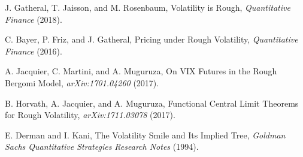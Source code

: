 \documentclass[12pt]{article}
\numberwithin{equation}{section}
\begin{document}
%
%
%
%

\begin{thebibliography}{}

 {J. Gatheral, T. Jaisson, and M. Rosenbaum},
{Volatility is Rough},
{\textit{Quantitative Finance}} (2018).

 { C. Bayer, P. Friz, and J. Gatheral},
{Pricing under Rough Volatility},
{\textit{Quantitative Finance}} (2016).

 { A. Jacquier, C. Martini, and A. Muguruza},
{On VIX Futures in the Rough Bergomi Model},
{\textit{arXiv:1701.04260}} (2017).

 { B. Horvath, A. Jacquier, and A. Muguruza},
{Functional Central Limit Theorems for Rough Volatility},
{\textit{arXiv:1711.03078}} (2017).

 { E. Derman and I. Kani},
{The Volatility Smile and Its Implied Tree},
{\textit{Goldman Sachs Quantitative Strategies Research Notes}} (1994).


\end{thebibliography}

\newpage


\end{document}
